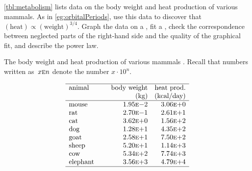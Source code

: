 \begin{exercise} \label{ex:metabolism} 
\cref{tbl:metabolism} lists data on the body weight and heat 
production of various mammals. 
As in \cref{eg:orbitalPeriods}, use this data to discover  that \((\text{heat})\propto(\text{weight})^{3/4}\).  
Graph the data on a , fit a , check the correspondence between neglected parts of the right-hand side and the quality of the graphical fit, and describe the power law.
\setbox\ajrqrbox\hbox{}%
\marginajrbox%
\begin{table}
\caption{The body weight and heat production of various mammals \cite[]{Kleiber1947}.  Recall that numbers written as~\(x\textsc{e}n\) denote the number \(x\cdot10^n\).}
\label{tbl:metabolism}
\begin{equation*}
\begin{array}{p{12ex}rr} \hline
animal&\text{body weight}&\text{heat prod.}\\
&(\text{kg})&\text{(kcal/day)}\\\hline
mouse&   1.95\textsc{e}{-}2 & 3.06\textsc{e}{+}0 \\
rat  &   2.70\textsc{e}{-}1 & 2.61\textsc{e}{+}1 \\
cat  &   3.62\textsc{e}{+}0 & 1.56\textsc{e}{+}2 \\
dog  &   1.28\textsc{e}{+}1 & 4.35\textsc{e}{+}2 \\
goat &   2.58\textsc{e}{+}1 & 7.50\textsc{e}{+}2 \\
sheep&   5.20\textsc{e}{+}1 & 1.14\textsc{e}{+}3 \\
cow  &   5.34\textsc{e}{+}2 & 7.74\textsc{e}{+}3 \\
elephant&3.56\textsc{e}{+}3 & 4.79\textsc{e}{+}4 \\
\hline
\end{array}
\end{equation*}
\end{table}%
\end{exercise}




